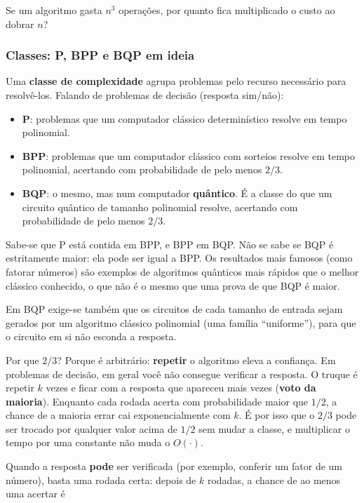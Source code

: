 Se um algoritmo gasta \(n^3\) operações, por quanto fica multiplicado o custo ao dobrar \(n\)?

\subsubsection{Classes: P, BPP e BQP em ideia}\label{classes-p-bpp-e-bqp-em-ideia}

Uma \textbf{classe de complexidade} agrupa problemas pelo recurso necessário para resolvê-los. Falando de problemas de decisão (resposta sim/não):

\begin{itemize}
\tightlist
\item
  \textbf{P}: problemas que um computador clássico determinístico resolve em tempo polinomial.
\item
  \textbf{BPP}: problemas que um computador clássico com sorteios resolve em tempo polinomial, acertando com probabilidade de pelo menos \(2/3\).
\item
  \textbf{BQP}: o mesmo, mas num computador \textbf{quântico}. É a classe do que um circuito quântico de tamanho polinomial resolve, acertando com probabilidade de pelo menos \(2/3\).
\end{itemize}

Sabe-se que P está contida em BPP, e BPP em BQP. Não se sabe se BQP é estritamente maior: ela pode ser igual a BPP. Os resultados mais famosos (como fatorar números) são exemplos de algoritmos quânticos mais rápidos que o melhor clássico conhecido, o que não é o mesmo que uma prova de que BQP é maior.

Em BQP exige-se também que os circuitos de cada tamanho de entrada sejam gerados por um algoritmo clássico polinomial (uma família ``uniforme''), para que o circuito em si não esconda a resposta.

Por que \(2/3\)? Porque é arbitrário: \textbf{repetir} o algoritmo eleva a confiança. Em problemas de decisão, em geral você não consegue verificar a resposta. O truque é repetir \(k\) vezes e ficar com a resposta que apareceu mais vezes (\textbf{voto da maioria}). Enquanto cada rodada acerta com probabilidade maior que \(1/2\), a chance de a maioria errar cai exponencialmente com \(k\). É por isso que o \(2/3\) pode ser trocado por qualquer valor acima de \(1/2\) sem mudar a classe, e multiplicar o tempo por uma constante não muda o \(O(\cdot)\).

Quando a resposta \textbf{pode} ser verificada (por exemplo, conferir um fator de um número), basta uma rodada certa: depois de \(k\) rodadas, a chance de ao menos uma acertar é

